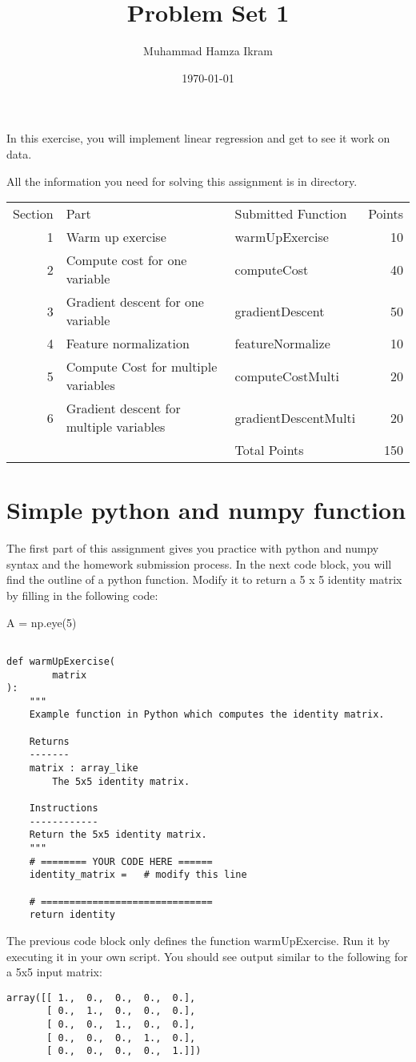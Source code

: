 \documentclass[11pt]{article}
\author{Muhammad Hamza Ikram}
\date{\today}
\title{Problem Set 1}
\begin{document}
\maketitle
\tableofcontents

\clearpage
In this exercise, you will implement linear regression and get to see it work on data.

All the information you need for solving this assignment is in directory.


\begin{center}
\begin{tabular}{rllr}
Section & Part & Submitted Function & Points\\
1 & Warm up exercise & warmUpExercise & 10\\
2 & Compute cost for one variable & computeCost & 40\\
3 & Gradient descent for one variable & gradientDescent & 50\\
4 & Feature normalization & featureNormalize & 10\\
5 & Compute Cost for multiple variables & computeCostMulti & 20\\
6 & Gradient descent for multiple variables & gradientDescentMulti & 20\\
 &  & Total Points & 150\\
\end{tabular}
\end{center}

\section{Simple python and numpy function}
\label{sec:org5c92cad}
The first part of this assignment gives you practice with python and numpy syntax and the homework submission process. In the next code block, you will find the outline of a python function. Modify it to return a 5 x 5 identity matrix by filling in the following code:

A = np.eye(5)

\begin{verbatim}

def warmUpExercise(
        matrix
):
    """
    Example function in Python which computes the identity matrix.

    Returns
    -------
    matrix : array_like
        The 5x5 identity matrix.

    Instructions
    ------------
    Return the 5x5 identity matrix.
    """
    # ======== YOUR CODE HERE ======
    identity_matrix =   # modify this line

    # ==============================
    return identity

\end{verbatim}
The previous code block only defines the function warmUpExercise. Run it by executing it in your own script. You should see output similar to the following for a 5x5 input matrix:
\begin{verbatim}
array([[ 1.,  0.,  0.,  0.,  0.],
       [ 0.,  1.,  0.,  0.,  0.],
       [ 0.,  0.,  1.,  0.,  0.],
       [ 0.,  0.,  0.,  1.,  0.],
       [ 0.,  0.,  0.,  0.,  1.]])

\end{verbatim}
\end{document}
